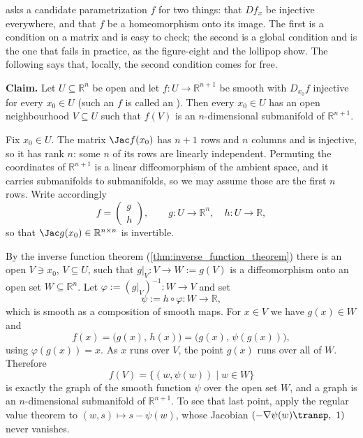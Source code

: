 \begin{example}
\label{ex:immersion_locally_submanifold}
 asks a candidate parametrization $f$ for two things: that $Df_x$
be injective everywhere, and that $f$ be a homeomorphism onto its image. The first is a condition
on a matrix and is easy to check; the second is a global condition and is the one that fails in
practice, as the figure-eight and the lollipop show. The following says that, locally, the second
condition comes for free.

\textbf{Claim.} Let $U \subseteq \mathbb{R}^n$ be open and let $f : U \to \mathbb{R}^{n+1}$ be
smooth with $D_{x_0}f$ injective for every $x_0 \in U$ (such an $f$ is called an
 ). Then every $x_0 \in U$ has an open neighbourhood
$V \subseteq U$ such that $f(V)$ is an $n$-dimensional submanifold of $\mathbb{R}^{n+1}$.

Fix $x_0 \in U$. The matrix $\Jac f(x_0)$ has $n+1$ rows and $n$ columns and is injective, so it
has rank $n$: some $n$ of its rows are linearly independent. Permuting the coordinates of
$\mathbb{R}^{n+1}$ is a linear diffeomorphism of the ambient space, and it carries submanifolds to
submanifolds, so we may assume those are the first $n$ rows. Write accordingly
\[f = \begin{pmatrix} g \\ h \end{pmatrix}, \qquad g : U \to \mathbb{R}^n,\quad
h : U \to \mathbb{R},\]
so that $\Jac g(x_0) \in \mathbb{R}^{n\times n}$ is invertible.

By the inverse function theorem (\cref{thm:inverse_function_theorem}) there is an open
$V \ni x_0$, $V \subseteq U$, such that $g|_V : V \to W := g(V)$ is a diffeomorphism onto an open
set $W \subseteq \mathbb{R}^n$. Let $\varphi := (g|_V)^{-1} : W \to V$ and set
\[\psi := h \circ \varphi : W \to \mathbb{R},\]
which is smooth as a composition of smooth maps. For $x \in V$ we have $g(x) \in W$ and
\[f(x) = \big(g(x),\, h(x)\big) = \big(g(x),\, \psi(g(x))\big),\]
using $\varphi(g(x)) = x$. As $x$ runs over $V$, the point $g(x)$ runs over all of $W$. Therefore
\[f(V) = \{(w,\psi(w)) \mid w \in W\}\]
is exactly the graph of the smooth function $\psi$ over the open set $W$, and a graph is an
$n$-dimensional submanifold of $\mathbb{R}^{n+1}$. To see that last point, apply the regular value
theorem to $(w,s) \mapsto s - \psi(w)$, whose Jacobian $(-\nabla\psi(w)\transp,\ 1)$ never
vanishes.


\end{example}
